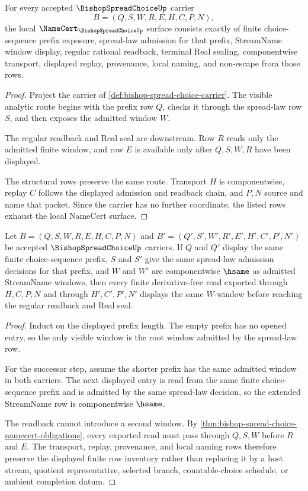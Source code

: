 \begin{theorem}
\label{thm:bishop-spread-choice-namecert-obligations}
For every accepted $\BishopSpreadChoiceUp$ carrier
$$
B=(Q,S,W,R,E,H,C,P,N),
$$
the local $\NameCert_{\BishopSpreadChoiceUp}$ surface consists exactly of finite choice-sequence prefix exposure, spread-law admission for that prefix, StreamName window display, regular rational readback, terminal Real sealing, componentwise transport, displayed replay, provenance, local naming, and non-escape from those rows.
\end{theorem}
\begin{proof}
Project the carrier of \autoref{def:bishop-spread-choice-carrier}. The visible analytic route begins with the prefix row $Q$, checks it through the spread-law row $S$, and then exposes the admitted window $W$.

The regular readback and Real seal are downstream. Row $R$ reads only the admitted finite window, and row $E$ is available only after $Q,S,W,R$ have been displayed.

The structural rows preserve the same route. Transport $H$ is componentwise, replay $C$ follows the displayed admission and readback chain, and $P,N$ source and name that packet. Since the carrier has no further coordinate, the listed rows exhaust the local NameCert surface.
\end{proof}

\begin{theorem}
\label{thm:bishop-spread-choice-finite-prefix-stability}
Let $B=(Q,S,W,R,E,H,C,P,N)$ and $B'=(Q',S',W',R',E',H',C',P',N')$ be accepted $\BishopSpreadChoiceUp$ carriers. If $Q$ and $Q'$ display the same finite choice-sequence prefix, $S$ and $S'$ give the same spread-law admission decisions for that prefix, and $W$ and $W'$ are componentwise $\hsame$ as admitted StreamName windows, then every finite derivative-free read exported through $H,C,P,N$ and through $H',C',P',N'$ displays the same $W$-window before reaching the regular readback and Real seal.
\end{theorem}
\begin{proof}
Induct on the displayed prefix length. The empty prefix has no opened entry, so the only visible window is the root window admitted by the spread-law row.

For the successor step, assume the shorter prefix has the same admitted window in both carriers. The next displayed entry is read from the same finite choice-sequence prefix and is admitted by the same spread-law decision, so the extended StreamName row is componentwise $\hsame$.

The readback cannot introduce a second window. By \autoref{thm:bishop-spread-choice-namecert-obligations}, every exported read must pass through $Q,S,W$ before $R$ and $E$. The transport, replay, provenance, and local naming rows therefore preserve the displayed finite row inventory rather than replacing it by a host stream, quotient representative, selected branch, countable-choice schedule, or ambient completion datum.
\end{proof}

